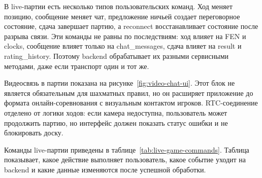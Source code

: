 
В live-партии есть несколько типов пользовательских команд. Ход меняет позицию, сообщение меняет чат, предложение ничьей создает переговорное состояние, сдача завершает партию, а reconnect восстанавливает состояние после разрыва связи. Эти команды не равны по последствиям: ход влияет на FEN и clocks, сообщение влияет только на chat_messages, сдача влияет на result и rating_history. Поэтому backend обрабатывает их разными сервисными методами, даже если транспорт один и тот же.

Видеосвязь в партии показана на рисунке~\ref{fig:video-chat-ui}. Этот блок не является обязательным для шахматных правил, но он расширяет приложение до формата онлайн-соревнования с визуальным контактом игроков. RTC-соединение отделено от логики ходов: если камера недоступна, пользователь может продолжить партию, но интерфейс должен показать статус ошибки и не блокировать доску.


Команды live-партии приведены в таблице~\ref{tab:live-game-commands}. Таблица показывает, какое действие выполняет пользователь, какое событие уходит на backend и какие данные изменяются после успешной обработки.

